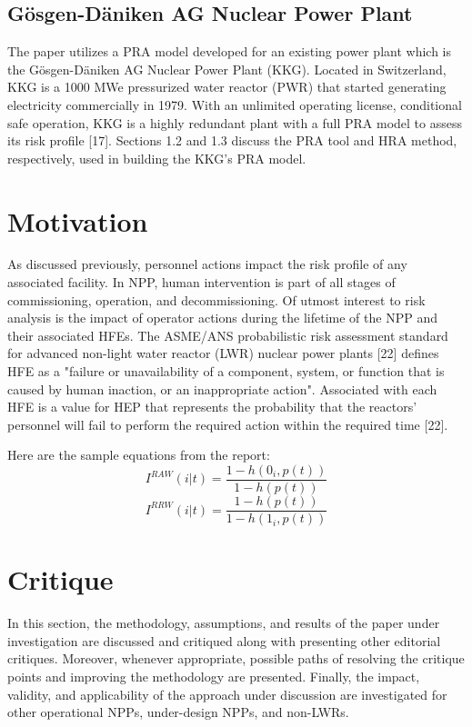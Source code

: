 \documentclass[11pt, letterpaper]{article}
\begin{document}
\subsection{Gösgen-Däniken AG Nuclear Power Plant}
The paper utilizes a PRA model developed for an existing power plant which is the Gösgen-Däniken AG Nuclear Power Plant (KKG). Located in Switzerland, KKG is a 1000 MWe pressurized water reactor (PWR) that started generating electricity commercially in 1979. With an unlimited operating license, conditional safe operation, KKG is a highly redundant plant with a full PRA model to assess its risk profile [17]. Sections 1.2 and 1.3 discuss the PRA tool and HRA method, respectively, used in building the KKG's PRA model.

\section{Motivation}
As discussed previously, personnel actions impact the risk profile of any associated facility. In NPP, human intervention is part of all stages of commissioning, operation, and decommissioning. Of utmost interest to risk analysis is the impact of operator actions during the lifetime of the NPP and their associated HFEs. The ASME/ANS probabilistic risk assessment standard for advanced non-light water reactor (LWR) nuclear power plants [22] defines HFE as a "failure or unavailability of a component, system, or function that is caused by human inaction, or an inappropriate action". Associated with each HFE is a value for HEP that represents the probability that the reactors' personnel will fail to perform the required action within the required time [22].

Here are the sample equations from the report:
\begin{equation}
I^{RAW}(i|t)=\frac{1-h(0_{i},p(t))}{1-h(p(t))}
\end{equation}
\begin{equation}
I^{RRW}(i|t)=\frac{1-h(p(t))}{1-h(1_{i},p(t))}
\end{equation}

\section{Critique}
In this section, the methodology, assumptions, and results of the paper under investigation are discussed and critiqued along with presenting other editorial critiques. Moreover, whenever appropriate, possible paths of resolving the critique points and improving the methodology are presented. Finally, the impact, validity, and applicability of the approach under discussion are investigated for other operational NPPs, under-design NPPs, and non-LWRs.
\end{document}
